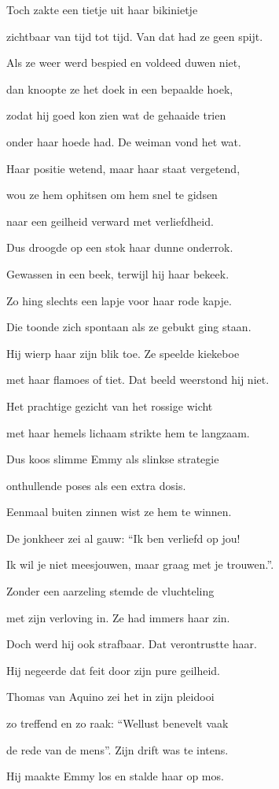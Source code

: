 Toch zakte een tietje
uit haar bikinietje

zichtbaar van tijd tot tijd.
Van dat had ze geen spijt.

Als ze weer werd bespied
en voldeed duwen niet,

dan knoopte ze het doek
in een bepaalde hoek,

zodat hij goed kon zien
wat de gehaaide trien

onder haar hoede had.
De weiman vond het wat.

Haar positie wetend,
maar haar staat vergetend,

wou ze hem ophitsen
om hem snel te gidsen

naar een geilheid
verward met verliefdheid.

Dus droogde op een stok
haar dunne onderrok.

Gewassen in een beek,
terwijl hij haar bekeek.

Zo hing slechts een lapje
voor haar rode kapje.

Die toonde zich spontaan
als ze gebukt ging staan.

Hij wierp haar zijn blik toe.
Ze speelde kiekeboe

met haar flamoes of tiet.
Dat beeld weerstond hij niet.

Het prachtige gezicht
van het rossige wicht

met haar hemels lichaam
strikte hem te langzaam.

Dus koos slimme Emmy
als slinkse strategie

onthullende poses
als een extra dosis.

Eenmaal buiten zinnen
wist ze hem te winnen.

De jonkheer zei al gauw:
“Ik ben verliefd op jou!

Ik wil je niet meesjouwen,
maar graag met je trouwen.”.

Zonder een aarzeling
stemde de vluchteling

met zijn verloving in.
Ze had immers haar zin.

Doch werd hij ook strafbaar.
Dat verontrustte haar.

Hij negeerde dat feit
door zijn pure geilheid.

Thomas van Aquino
zei het in zijn pleidooi

zo treffend en zo raak:
“Wellust benevelt vaak

de rede van de mens”.
Zijn drift was te intens.

Hij maakte Emmy los
en stalde haar op mos.

